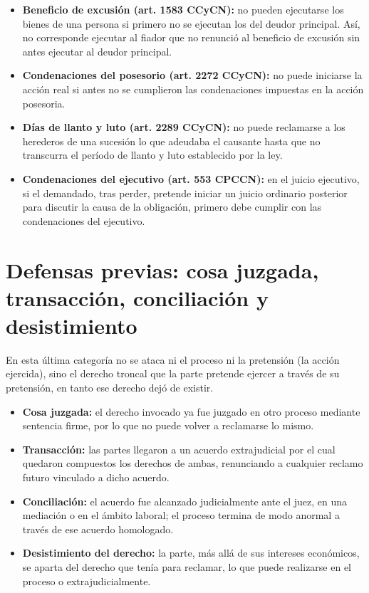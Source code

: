 \documentclass[12pt,oneside]{book}
\begin{document}
\begin{itemize}
    \item \textbf{Beneficio de excusión (art. 1583 CCyCN):} no pueden ejecutarse los bienes de una persona si primero no se ejecutan los del deudor principal. Así, no corresponde ejecutar al fiador que no renunció al beneficio de excusión sin antes ejecutar al deudor principal.
    \item \textbf{Condenaciones del posesorio (art. 2272 CCyCN):} no puede iniciarse la acción real si antes no se cumplieron las condenaciones impuestas en la acción posesoria.
    \item \textbf{Días de llanto y luto (art. 2289 CCyCN):} no puede reclamarse a los herederos de una sucesión lo que adeudaba el causante hasta que no transcurra el período de llanto y luto establecido por la ley.
    \item \textbf{Condenaciones del ejecutivo (art. 553 CPCCN):} en el juicio ejecutivo, si el demandado, tras perder, pretende iniciar un juicio ordinario posterior para discutir la causa de la obligación, primero debe cumplir con las condenaciones del ejecutivo.
\end{itemize}

\section{Defensas previas: cosa juzgada, transacción, conciliación y desistimiento}

\begin{important}
En esta última categoría no se ataca ni el proceso ni la pretensión (la acción ejercida), sino el derecho troncal que la parte pretende ejercer a través de su pretensión, en tanto ese derecho dejó de existir.
\end{important}

\begin{itemize}
    \item \textbf{Cosa juzgada:} el derecho invocado ya fue juzgado en otro proceso mediante sentencia firme, por lo que no puede volver a reclamarse lo mismo.
    \item \textbf{Transacción:} las partes llegaron a un acuerdo extrajudicial por el cual quedaron compuestos los derechos de ambas, renunciando a cualquier reclamo futuro vinculado a dicho acuerdo.
    \item \textbf{Conciliación:} el acuerdo fue alcanzado judicialmente ante el juez, en una mediación o en el ámbito laboral; el proceso termina de modo anormal a través de ese acuerdo homologado.
    \item \textbf{Desistimiento del derecho:} la parte, más allá de sus intereses económicos, se aparta del derecho que tenía para reclamar, lo que puede realizarse en el proceso o extrajudicialmente.
\end{itemize}
\end{document}
